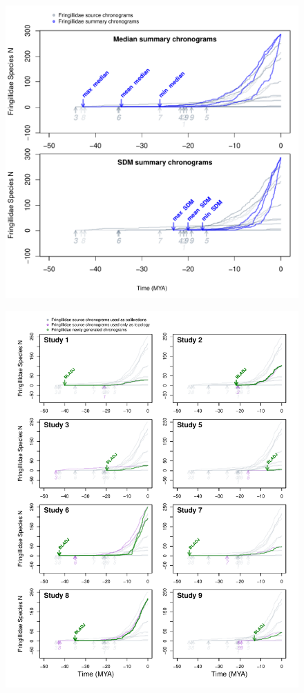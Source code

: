 \documentclass[]{article}
\begin{document}
\begin{figure}[!h]
\includegraphics{fig_summaries.pdf}
\caption{}
\label{fig:summaries}
\end{figure}

\newpage

\begin{figure}[!h]
\includegraphics{fig_crossval_bladj.pdf}
\caption{}
\label{fig:cvbladj}
\end{figure}
\end{document}
